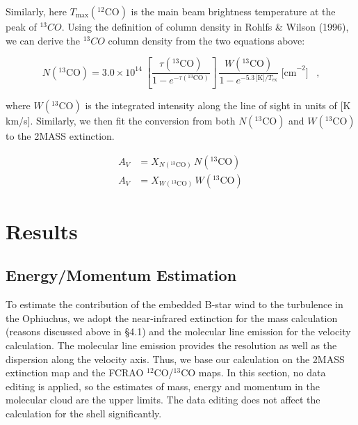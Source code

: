 \documentclass[11pt,a4paper]{emulateapj}
\begin{document}
Similarly, here $T_{\text{max}}(^{12}\text{CO})$ is the main beam brightness temperature at the peak of $^{13}CO$. Using the definition of column density in Rohlfs \& Wilson (1996), we can derive the $^{13}CO$ column density from the two equations above:

\begin{equation}
N(^{13}\text{CO}) = 3.0\times10^{14}\;\left[\frac{\tau(^{13}\text{CO})}{1-e^{-\tau(^{13}\text{CO})}}\right]\,\frac{W(^{13}\text{CO})}{1-e^{-5.3\,\text{[K]}/T_{\text{ex}}}}\;\text{[cm}^{-2}\text{]}\;\;\;\text{,}
\end{equation}

where $W(^{13}\text{CO})$ is the integrated intensity along the line of sight in units of [K km/s]. Similarly, we then fit the conversion from both $N(^{13}\text{CO})$ and $W(^{13}\text{CO})$ to the 2MASS extinction.

\begin{equation}
\begin{aligned}
A_V &= X_{N(^{13}\text{CO})}\,N(^{13}\text{CO}) \\
A_V &= X_{W(^{13}\text{CO})}\,W(^{13}\text{CO})
\end{aligned}
\end{equation}


\section{Results}
\label{sec:results}

\subsection{Energy/Momentum Estimation}
To estimate the contribution of the embedded B-star wind to the turbulence in the Ophiuchus, we adopt the near-infrared extinction for the mass calculation (reasons discussed above in \S4.1) and the molecular line emission for the velocity calculation. The molecular line emission provides the resolution as well as the dispersion along the velocity axis. Thus, we base our calculation on the 2MASS extinction map and the FCRAO $^{12}$CO/$^{13}$CO maps. In this section, no data editing is applied, so the estimates of mass, energy and momentum in the molecular cloud are the upper limits. The data editing does not affect the calculation for the shell significantly.
\end{document}
